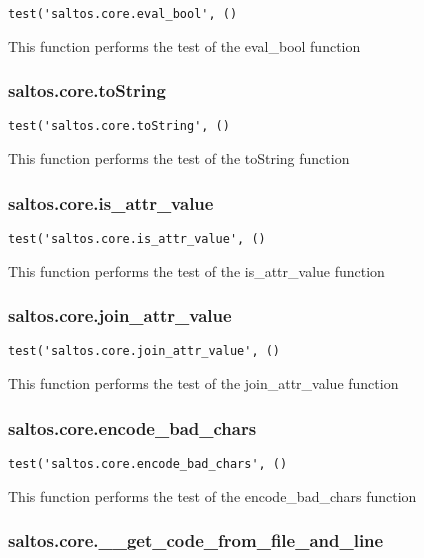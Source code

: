 \documentclass[a4paper]{article}
\begin{document}
\begin{lstlisting}
test('saltos.core.eval_bool', ()
\end{lstlisting}

This function performs the test of the eval\_bool function

\hypertarget{toc532}{}
\subsubsection{saltos.core.toString}

\begin{lstlisting}
test('saltos.core.toString', ()
\end{lstlisting}

This function performs the test of the toString function

\hypertarget{toc533}{}
\subsubsection{saltos.core.is\_attr\_value}

\begin{lstlisting}
test('saltos.core.is_attr_value', ()
\end{lstlisting}

This function performs the test of the is\_attr\_value function

\hypertarget{toc534}{}
\subsubsection{saltos.core.join\_attr\_value}

\begin{lstlisting}
test('saltos.core.join_attr_value', ()
\end{lstlisting}

This function performs the test of the join\_attr\_value function

\hypertarget{toc535}{}
\subsubsection{saltos.core.encode\_bad\_chars}

\begin{lstlisting}
test('saltos.core.encode_bad_chars', ()
\end{lstlisting}

This function performs the test of the encode\_bad\_chars function

\hypertarget{toc536}{}
\subsubsection{saltos.core.\_\_get\_code\_from\_file\_and\_line}
\end{document}
